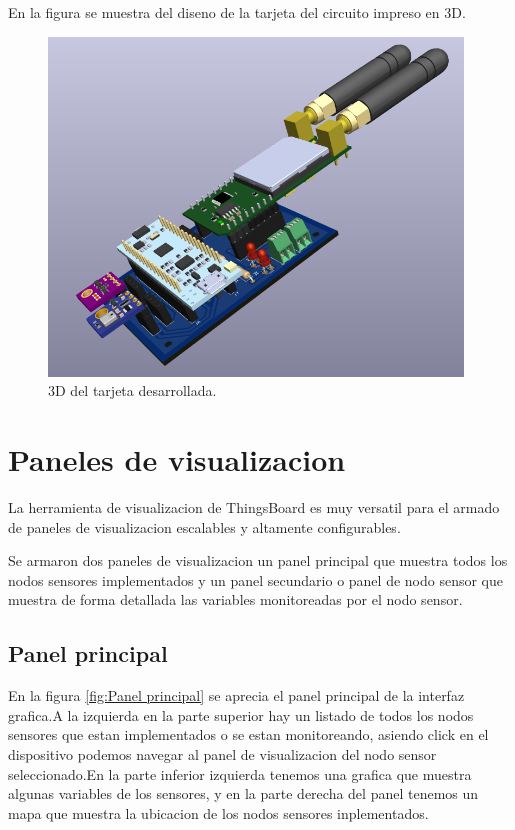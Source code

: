\clearpage
En la figura se muestra del diseno de la tarjeta del circuito impreso en 3D.
\begin{figure}[h!]
  \centering
	\includegraphics[width=\textwidth, height=9cm]{./Figures/tarjeta3d.png}
  \caption{3D del tarjeta desarrollada.}
	\label{fig:3D del modulo}
\end{figure}


\clearpage
\section{Paneles de visualizacion}
La herramienta de visualizacion de ThingsBoard es muy versatil para el armado de paneles de visualizacion escalables y altamente configurables.

Se armaron dos paneles de visualizacion un panel principal que muestra todos los nodos sensores implementados y un panel secundario o panel de nodo sensor que muestra de forma detallada las variables monitoreadas por el nodo sensor.
\subsection{Panel principal} 

En la figura \ref{fig:Panel principal} se aprecia el panel principal de la interfaz grafica.A la izquierda en la parte superior hay un listado de todos los nodos sensores que estan implementados o se estan monitoreando, asiendo click en el dispositivo podemos navegar al panel de visualizacion del nodo sensor seleccionado.En la parte inferior izquierda tenemos una grafica que muestra algunas variables de los sensores,
y en la parte derecha del panel tenemos un mapa que muestra la ubicacion de los nodos sensores inplementados.

